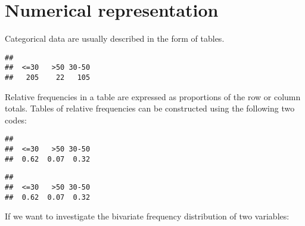 \documentclass[]{book}
\newenvironment{Shaded}{\begin{snugshade}}{\end{snugshade}}
\newcommand{\KeywordTok}[1]{\textcolor[rgb]{0.13,0.29,0.53}{\textbf{#1}}}
\newcommand{\DecValTok}[1]{\textcolor[rgb]{0.00,0.00,0.81}{#1}}
\newcommand{\CommentTok}[1]{\textcolor[rgb]{0.56,0.35,0.01}{\textit{#1}}}
\newcommand{\OperatorTok}[1]{\textcolor[rgb]{0.81,0.36,0.00}{\textbf{#1}}}
\newcommand{\NormalTok}[1]{#1}
\theoremstyle{definition}
\theoremstyle{definition}
\theoremstyle{definition}
\theoremstyle{remark}
\begin{document}
\section{Numerical representation}\label{numerical-representation-3}

Categorical data are usually described in the form of tables.

\begin{Shaded}
\end{Shaded}

\begin{verbatim}
## 
##  <=30   >50 30-50 
##   205    22   105
\end{verbatim}

Relative frequencies in a table are expressed as proportions of the row
or column totals. Tables of relative frequencies can be constructed
using the following two codes:

\begin{Shaded}
\end{Shaded}

\begin{verbatim}
## 
##  <=30   >50 30-50 
##  0.62  0.07  0.32
\end{verbatim}

\begin{Shaded}
\end{Shaded}

\begin{verbatim}
## 
##  <=30   >50 30-50 
##  0.62  0.07  0.32
\end{verbatim}

If we want to investigate the bivariate frequency distribution of two
variables:
\end{document}
